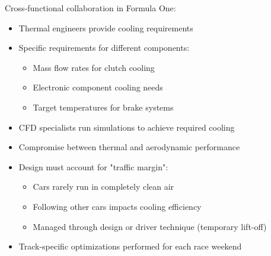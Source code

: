 Cross-functional collaboration in Formula One:
\begin{itemize}
    \item Thermal engineers provide cooling requirements
    \item Specific requirements for different components:
    \begin{itemize}
        \item Mass flow rates for clutch cooling
        \item Electronic component cooling needs
        \item Target temperatures for brake systems
    \end{itemize}
    \item CFD specialists run simulations to achieve required cooling
    \item Compromise between thermal and aerodynamic performance
    \item Design must account for "traffic margin":
    \begin{itemize}
        \item Cars rarely run in completely clean air
        \item Following other cars impacts cooling efficiency
        \item Managed through design or driver technique (temporary lift-off)
    \end{itemize}
    \item Track-specific optimizations performed for each race weekend
\end{itemize}